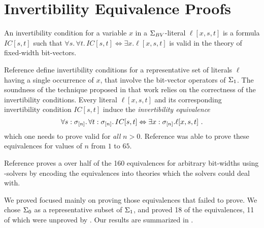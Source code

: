 \documentclass[conference]{IEEEtran}
\begin{document}
\section{Invertibility Equivalence Proofs}
\label{ieproofs}
An invertibility condition for a variable $x$ in a $\Sigma_{BV}$-literal $\ell[x,s,t]$ is
a formula $IC[s,t]$ such that
$\forall s.\,\forall t.\,IC[s,t] \Leftrightarrow \exists x.\ell[x,s,t]$ is valid in the theory of fixed-width bit-vectors.

Reference \cite{b1} define invertibility conditions for 
a representative set of literals $\ell$ having a single occurrence of $x$,
that involve the bit-vector operators of $\Sigma_{1}$.
The soundness of the technique proposed in that work 
relies on the correctness of the invertibility conditions.
Every literal $\ell[x,s,t]$ and its corresponding invertibility condition $IC[s,t]$
induce the \emph{invertibility equivalence}
\[
\forall s:\sigma_{[n]}.\,\forall t:\sigma_{[n]}.\,IC[s,t] \Leftrightarrow \exists x:\sigma_{[n]}.\ell[x,s,t] \ .
\]
which one needs to prove valid for \emph{all} $n >0$.
Reference \cite{b1} was able to prove these 
equivalences for values of $n$ from $1$ to $65$.

Reference \cite{b2} proves a over half of the 160 
equivalences for arbitrary bit-widths 
using \smt-solvers by encoding the equivalences 
into theories which the solvers could deal with.

We proved focused mainly on proving those equivalences 
that \cite{b2} failed to prove. We chose $\Sigma_{0}$ as a 
representative subset of $\Sigma_{1}$, and proved 18 of the 
equivalences, 11 of which were unproved by \cite{b2}. Our 
results are summarized in .
\end{document}
